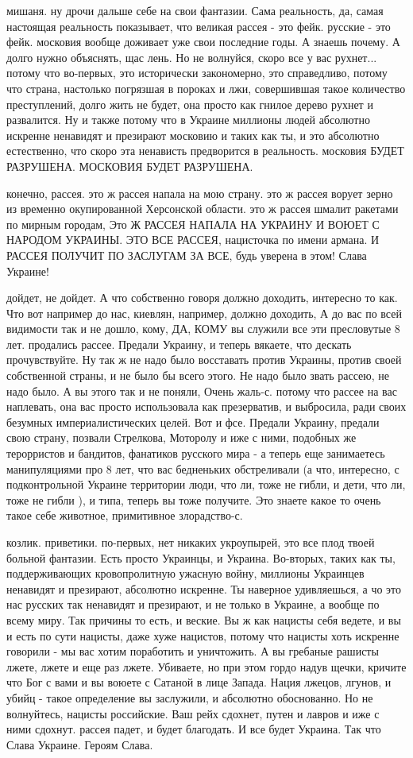 мишаня. ну дрочи дальше себе на свои фантазии. Сама реальность, да, самая
настоящая реальность показывает, что великая рассея - это фейк. русские - это
фейк. московия вообще доживает уже свои последние годы. А знаешь почему. А
долго нужно объяснять, щас лень. Но не волнуйся, скоро все у вас рухнет...
потому что во-первых, это исторически закономерно, это справедливо, потому что
страна, настолько погрязшая в пороках и лжи, совершившая такое количество
преступлений, долго жить не будет, она просто как гнилое дерево рухнет и
развалится. Ну и также потому что в Украине миллионы людей абсолютно искренне
ненавидят и презирают московию и таких как ты, и это абсолютно естественно, что
скоро эта ненависть предворится в реальность. московия БУДЕТ РАЗРУШЕНА.
МОСКОВИЯ БУДЕТ РАЗРУШЕНА.

конечно, рассея. это ж рассея напала на мою страну. это ж рассея ворует зерно
из временно окупированной Херсонской области. это ж рассея шмалит ракетами по
мирным городам, Это Ж РАССЕЯ НАПАЛА НА УКРАИНУ И ВОЮЕТ С НАРОДОМ УКРАИНЫ. ЭТО
ВСЕ РАССЕЯ, нацисточка по имени армана. И РАССЕЯ ПОЛУЧИТ ПО ЗАСЛУГАМ ЗА ВСЕ,
будь уверена в этом! Слава Украине!

дойдет, не дойдет. А что собственно говоря должно доходить, интересно то как.
Что вот например до нас, киевлян, например, должно доходить, А до вас по всей
видимости так и не дошло, кому, ДА, КОМУ вы служили все эти пресловутые 8 лет.
продались рассее. Предали Украину, и теперь вякаете, что дескать прочувствуйте.
Ну так ж не надо было восставать против Украины, против своей собственной
страны, и не было бы всего этого. Не надо было звать рассею, не надо было. А вы
этого так и не поняли, Очень жаль-с. потому что рассее на вас наплевать, она
вас просто использовала как презерватив, и выбросила, ради своих безумных
империалистических целей. Вот и фсе. Предали Украину, предали свою страну,
позвали Стрелкова, Моторолу и иже с ними, подобных же терорристов и бандитов,
фанатиков русского мира - а теперь еще занимаетесь манипуляциями про 8 лет, что
вас бедненьких обстреливали (а что, интересно, с подконтрольной Украине
территории люди, что ли, тоже не гибли, и дети, что ли, тоже не гибли ), и
типа, теперь вы тоже получите. Это знаете какое то очень такое себе животное,
примитивное злорадство-с.

козлик. приветики. по-первых, нет никаких укроупырей, это все плод твоей
больной фантазии. Есть просто Украинцы, и Украина. Во-вторых, таких как ты,
поддерживающих кровопролитную ужасную войну, миллионы Украинцев ненавидят и
презирают, абсолютно искренне. Ты наверное удивляешься, а чо это нас русских
так ненавидят и презирают, и не только в Украине, а вообще по всему миру. Так
причины то есть, и веские. Вы ж как нацисты себя ведете, и вы и есть по сути
нацисты, даже хуже нацистов, потому что нацисты хоть искренне говорили - мы вас
хотим поработить и уничтожить. А вы гребаные рашисты лжете, лжете и еще раз
лжете. Убиваете, но при этом гордо надув щечки, кричите что Бог с вами и вы
воюете с Сатаной в лице Запада. Нация лжецов, лгунов, и убийц - такое
определение вы заслужили, и абсолютно обоснованно. Но не волнуйтесь, нацисты
российские. Ваш рейх сдохнет, путен и лавров и иже с ними сдохнут. рассея
падет, и будет благодать. И все будет Украина. Так что Слава Украине. Героям
Слава.

